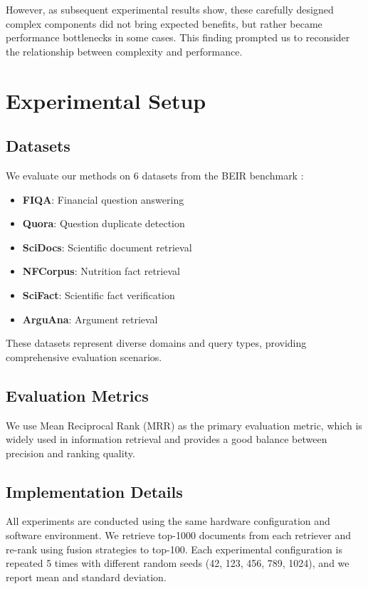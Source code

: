 \documentclass[letterpaper]{article} %
\begin{document}
However, as subsequent experimental results show, these carefully designed complex components did not bring expected benefits, but rather became performance bottlenecks in some cases. This finding prompted us to reconsider the relationship between complexity and performance.

\section{Experimental Setup}

\subsection{Datasets}

We evaluate our methods on 6 datasets from the BEIR benchmark \cite{thakur2021beir}:

\begin{itemize}
\item \textbf{FIQA}: Financial question answering
\item \textbf{Quora}: Question duplicate detection
\item \textbf{SciDocs}: Scientific document retrieval
\item \textbf{NFCorpus}: Nutrition fact retrieval
\item \textbf{SciFact}: Scientific fact verification
\item \textbf{ArguAna}: Argument retrieval
\end{itemize}

These datasets represent diverse domains and query types, providing comprehensive evaluation scenarios.

\subsection{Evaluation Metrics}

We use Mean Reciprocal Rank (MRR) as the primary evaluation metric, which is widely used in information retrieval and provides a good balance between precision and ranking quality.

\subsection{Implementation Details}

All experiments are conducted using the same hardware configuration and software environment. We retrieve top-1000 documents from each retriever and re-rank using fusion strategies to top-100. Each experimental configuration is repeated 5 times with different random seeds (42, 123, 456, 789, 1024), and we report mean and standard deviation.
\end{document}
